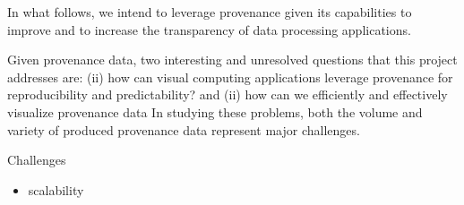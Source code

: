 {\color{Fuchsia}In what follows, we intend to leverage provenance given its capabilities to improve and to increase the transparency of data processing applications.}

Given provenance data, two interesting and unresolved questions that this project addresses are: (ii) how can visual computing applications leverage provenance for reproducibility and predictability? and (ii) how can we efficiently and effectively visualize provenance data  In studying these problems, both the volume and variety of produced provenance data represent major challenges.


Challenges
\begin{itemize}
\item scalability 



\end{itemize}